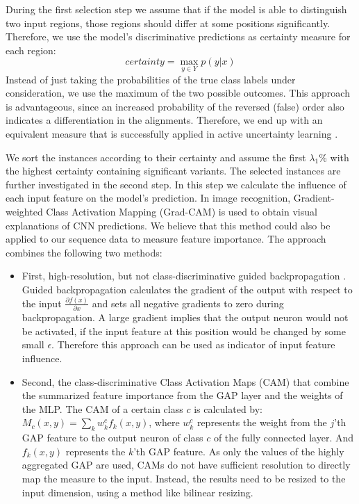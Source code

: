 \documentclass{article}
\begin{document}
During the first selection step we assume that if the model is able to distinguish two input regions, those regions should differ at some positions significantly. 
Therefore, we use the model's discriminative predictions as certainty measure for each region:
\begin{equation}
\label{eq:certainty}
certainty=\max\limits_{y\in Y} p(y|x)  
\end{equation}
Instead of just taking the probabilities of the true class labels under consideration, we use the maximum of the two possible outcomes. This approach is advantageous, since an increased probability of the reversed (false) order also indicates a differentiation in the alignments. Therefore, we end up with an equivalent measure that is successfully applied in active uncertainty learning \cite{uncertainty_al}.

We sort the instances according to their certainty and assume the first $\lambda_{1}$\% with the highest certainty containing significant variants. The selected instances are further investigated in the second step. 
In this step we calculate the influence of each input feature on the model's prediction.
In image recognition, Gradient-weighted Class Activation Mapping (Grad-CAM) \cite{Grad_CAM} is used to obtain visual explanations of CNN predictions. We believe that this method could also be applied to our sequence data to measure feature importance. The approach combines the following two methods:
\begin{itemize}
    \item First, high-resolution, but not class-discriminative guided backpropagation \cite{Backpropagation}. Guided backpropagation calculates the gradient of the output with respect to the input $\frac{\partial f(x)}{\partial x}$ and sets all negative gradients to zero during backpropagation. 
A large gradient implies that the output neuron would not be activated, if the input feature at this position would be changed by some small $\epsilon$. Therefore this approach can be used as indicator of input feature influence.
\item Second, the class-discriminative Class Activation Maps (CAM) that combine the summarized feature importance from the GAP layer and the weights of the MLP. The CAM of a certain class $c$ is calculated by: $M_{c}(x,y)=\sum\limits_{k}w_{k}^{c}f_{k}(x,y)$, where $w_{k}^{c}$ represents the weight from the $j$'th GAP feature to the output neuron of class $c$ of the fully connected layer. And $f_{k}(x,y)$ represents the $k$'th GAP feature. As only the values of the highly aggregated GAP are used, CAMs do not have sufficient resolution to directly map the measure to the input. Instead, the results need to be resized to the input dimension, using a method like bilinear resizing.
\end{itemize}
\end{document}
